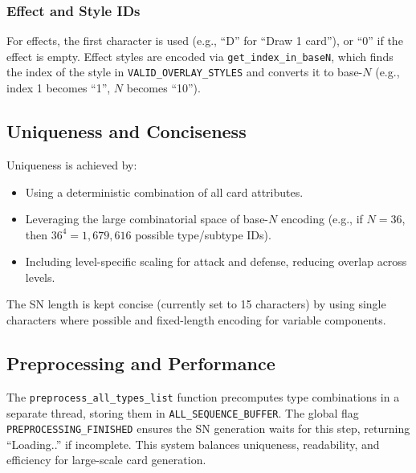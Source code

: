 \subsubsection{Effect and Style IDs}
For effects, the first character is used (e.g., ``D'' for ``Draw 1 card''), or ``0'' if the effect is empty. Effect styles are encoded via \texttt{get\_index\_in\_baseN}, which finds the index of the style in \texttt{VALID\_OVERLAY\_STYLES} and converts it to base-$N$ (e.g., index 1 becomes ``1'', $N$ becomes ``10'').

\subsection{Uniqueness and Conciseness}
Uniqueness is achieved by:
\begin{itemize}
	\item Using a deterministic combination of all card attributes.
	\item Leveraging the large combinatorial space of base-$N$ encoding (e.g., if $N=36$, then $36^4 = 1,679,616$ possible type/subtype IDs).
	\item Including level-specific scaling for attack and defense, reducing overlap across levels.
\end{itemize}
The SN length is kept concise (currently set to 15 characters) by using single characters where possible and fixed-length encoding for variable components.

\subsection{Preprocessing and Performance}
The \texttt{preprocess\_all\_types\_list} function precomputes type combinations in a separate thread, storing them in \texttt{ALL\_SEQUENCE\_BUFFER}. The global flag \texttt{PREPROCESSING\_FINISHED} ensures the SN generation waits for this step, returning ``Loading..'' if incomplete. This system balances uniqueness, readability, and efficiency for large-scale card generation.





